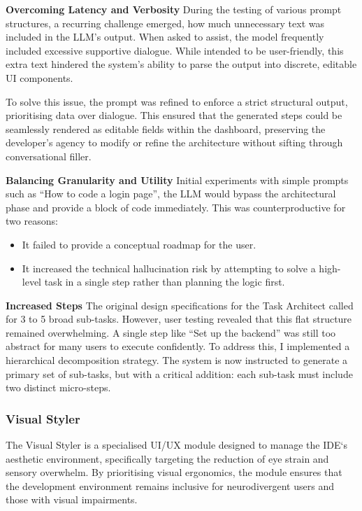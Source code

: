 \textbf{Overcoming Latency and Verbosity}
\newline
During the testing of various prompt structures, a recurring challenge emerged, how much unnecessary text was included in the \gls{LLM}'s output.
 When asked to assist, the model frequently included excessive supportive dialogue. While intended to be user-friendly, this extra text hindered the system's 
 ability to parse the output into discrete, editable UI components.

To solve this issue, the prompt was refined to enforce a strict structural output, prioritising data over dialogue. This ensured that the generated steps 
could be seamlessly rendered as editable fields within the dashboard, preserving the developer's agency to modify or refine the architecture without sifting 
through conversational filler.


\textbf{Balancing Granularity and Utility}
\newline
Initial experiments with simple prompts such as ``How to code a login page'', the \gls{LLM} would bypass the architectural phase and provide a block of code immediately. 
This was counterproductive for two reasons:

\begin{itemize}
    \item It failed to provide a conceptual roadmap for the user.
    \item It increased the technical hallucination risk by attempting to solve a high-level task in a single step rather than planning the logic first.
\end{itemize}

\textbf{Increased Steps}
\newline
The original design specifications for the Task Architect called for 3 to 5 broad sub-tasks. However, user testing revealed that this flat structure remained overwhelming. A single step like ``Set up the backend'' was still too abstract for many users to execute confidently.
To address this, I implemented a hierarchical decomposition strategy. The system is now instructed to generate a primary set of sub-tasks, but with a critical addition: each sub-task must include two distinct micro-steps.

\subsubsection{Visual Styler} 
The Visual Styler is a specialised UI/UX module designed to manage the \gls{IDE}`s aesthetic environment, specifically targeting the reduction of eye strain and sensory overwhelm. By prioritising visual ergonomics, the module ensures that the development environment remains inclusive for \gls{neurodivergent} users and those with visual impairments.

